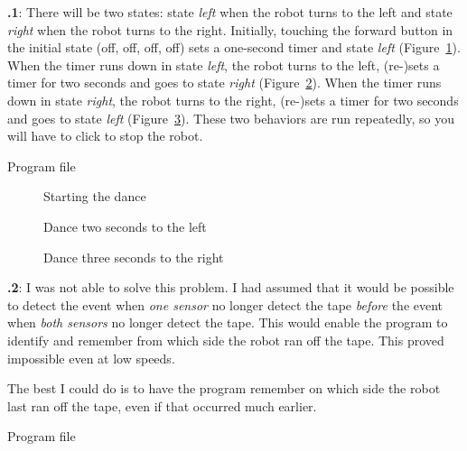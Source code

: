 \documentclass[12pt,a4paper,english]{article}
\begin{document}
\textbf{\thesection.1}:
There will be two states: state \emph{left}  when the
robot turns to the left and state \emph{right}  when
the robot turns to the right. Initially, touching the forward button in
the initial state (off, off, off, off) sets a one-second timer and state
\emph{left} (Figure~\ref{fig.dance-start}). When the timer runs down in
state \emph{left}, the robot turns to the left, (re-)sets a timer for
two seconds and goes to state \emph{right}
(Figure~\ref{fig.dance-left}). When the timer runs down in state
\emph{right}, the robot turns to the right, (re-)sets a timer for two
seconds and goes to state \emph{left} (Figure~\ref{fig.dance-right}).
These two behaviors are run repeatedly, so you will have to click
 to stop the robot.

{\raggedleft \hfill Program file }


\begin{figure}
\begin{center}
\caption{Starting the dance}\label{fig.dance-start}
\end{center}
\end{figure}

\begin{figure}
\begin{center}
\caption{Dance two seconds to the left}\label{fig.dance-left}
\end{center}
\end{figure}

\begin{figure}
\begin{center}
\caption{Dance three seconds to the right}\label{fig.dance-right}
\end{center}
\end{figure}

\textbf{\thesection.2}:
I was not able to solve this problem. I had assumed that it would be
possible to detect the event when \emph{one sensor} no longer detect the
tape \emph{before} the event when \emph{both sensors} no longer detect
the tape. This would enable the program to identify and remember from
which side the robot ran off the tape. This proved impossible even at
low speeds.

The best I could do is to have the program remember on which side the
robot last ran off the tape, even if that occurred much earlier.

{\raggedleft \hfill Program file }
\end{document}
